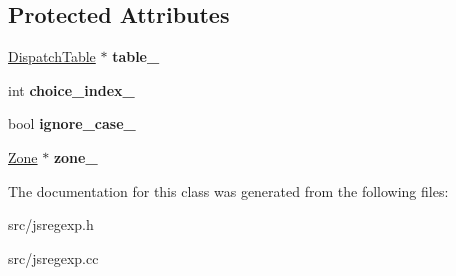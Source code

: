\subsection*{Protected Attributes}
\begin{DoxyCompactItemize}
\item 
\hypertarget{classv8_1_1internal_1_1_dispatch_table_constructor_ac24136ab00d4fba0fc0077970832842d}{}\hyperlink{classv8_1_1internal_1_1_dispatch_table}{Dispatch\+Table} $\ast$ {\bfseries table\+\_\+}\label{classv8_1_1internal_1_1_dispatch_table_constructor_ac24136ab00d4fba0fc0077970832842d}

\item 
\hypertarget{classv8_1_1internal_1_1_dispatch_table_constructor_a5e4b4a8a541c0d4743049ad864812ec2}{}int {\bfseries choice\+\_\+index\+\_\+}\label{classv8_1_1internal_1_1_dispatch_table_constructor_a5e4b4a8a541c0d4743049ad864812ec2}

\item 
\hypertarget{classv8_1_1internal_1_1_dispatch_table_constructor_a5d2858b027b6417237daaaff21070656}{}bool {\bfseries ignore\+\_\+case\+\_\+}\label{classv8_1_1internal_1_1_dispatch_table_constructor_a5d2858b027b6417237daaaff21070656}

\item 
\hypertarget{classv8_1_1internal_1_1_dispatch_table_constructor_aa66c09c6c54e03b653d344c2c172c396}{}\hyperlink{classv8_1_1internal_1_1_zone}{Zone} $\ast$ {\bfseries zone\+\_\+}\label{classv8_1_1internal_1_1_dispatch_table_constructor_aa66c09c6c54e03b653d344c2c172c396}

\end{DoxyCompactItemize}


The documentation for this class was generated from the following files\+:\begin{DoxyCompactItemize}
\item 
src/jsregexp.\+h\item 
src/jsregexp.\+cc\end{DoxyCompactItemize}
